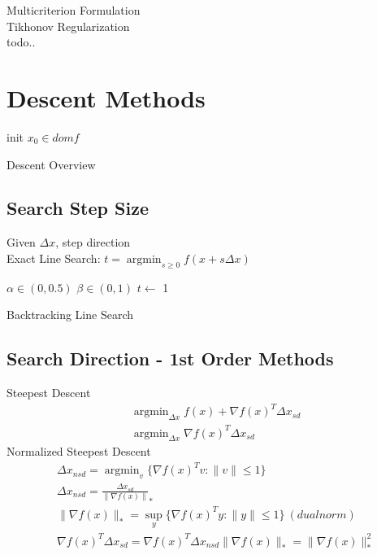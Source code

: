 \documentclass[8pt]{report}
\DeclareMathOperator*{\argmin}{argmin}
\newcommand{\norm}[1]{\|#1\|}
\newcommand{\set}[1]{\{#1\}}
\begin{document}
\begin{multicols*}{2}
  Multicriterion Formulation\\

  Tikhonov Regularization\\
  todo..
  
  \vfill\null
  
  \pagebreak

  \section{Descent Methods}

  \begin{algorithm}[H]
    init $x_0 \in dom f$\;
    \caption{Descent Overview\label{Descent}}
  \end{algorithm}
  
  \subsection{Search Step Size}
  Given $\Delta x$, step direction\\
  
  Exact Line Search: $t = \argmin_{s\geq 0} f(x+s \Delta x)$\\

  \begin{algorithm}[H]
    $\alpha \in (0,0.5)$\;
    $\beta \in (0,1)$\;
    $t \leftarrow$ 1\;
    \caption{Backtracking Line Search\label{LS_BT}}
  \end{algorithm}

  \vfill\null
  \columnbreak
  
  \subsection{Search Direction - 1st Order Methods}
  Steepest Descent
  \begin{align*}
    &\argmin_{\Delta x} f(x) + \nabla f(x)^T \Delta x_{sd}\\
    &\argmin_{\Delta x} \nabla f(x)^T \Delta x_{sd}
  \end{align*}
  Normalized Steepest Descent
  \begin{align*}
    &\Delta x_{nsd} = \argmin_{v} \set{ \nabla f(x)^T v : \norm{v} \leq 1 }\\
    &\Delta x_{nsd} = \frac{\Delta x_{sd}}{\norm{\nabla f(x)}}_*\\
    &\norm{\nabla f(x)}_* = \sup_y \{\nabla f(x)^T y: \|y\| \leq 1 \}\ (dual norm)\\
    &\nabla f(x)^T \Delta x_{sd} = \nabla f(x)^T \Delta x_{nsd} \norm{\nabla f(x)}_* = \norm{\nabla f(x)}_*^2
  \end{align*}


\end{multicols*}
\end{document}
